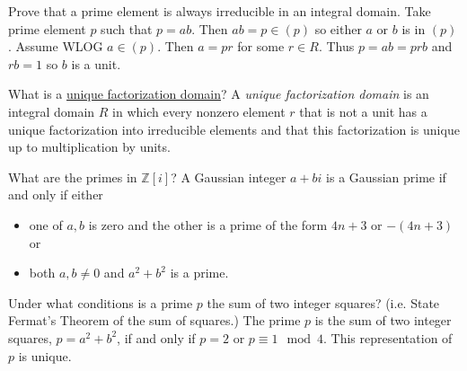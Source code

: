 \documentclass[avery5371,grid]{flashcards}
\newcommand{\Z}{\mathbb{Z}}
\begin{document}
\begin{flashcard}[Rings]{Prove that a prime element is always irreducible in an integral domain.}
 Take prime element $p$ such that $p = ab$. Then $ab = p \in (p)$ so either $a$ or $b$ is in $(p)$. Assume WLOG $a \in (p)$. Then $a = pr$ for some $r \in R$. Thus $p = ab = prb$ and $rb = 1$ so $b$ is a unit.
\end{flashcard}

\begin{flashcard}[Rings]{What is a \underline{unique factorization domain}?}
 A \emph{unique factorization domain} is an integral domain $R$ in which every nonzero element $r$ that is not a unit has a unique factorization into irreducible elements and that this factorization is unique up to multiplication by units.
\end{flashcard}

\begin{flashcard}[Rings]{What are the primes in $\Z[i]$?}
 A Gaussian integer $a+bi$ is a Gaussian prime if and only if either
 \begin{itemize}
      \item one of $a,b$ is zero and the other is a prime of the form $4n+3$ or $-(4n+3)$ or
      \item both $a,b \neq 0$ and $a^2 + b^2$ is a prime.
 \end{itemize}
\end{flashcard}

\begin{flashcard}[Rings]{Under what conditions is a prime $p$ the sum of two integer squares? (i.e. State Fermat's Theorem of the sum of squares.)}
 The prime $p$ is the sum of two integer squares, $p = a^2 + b^2$, if and only if $p=2$ or $p \equiv 1 \mod 4$. This representation of $p$ is unique.
\end{flashcard}
\end{document}
